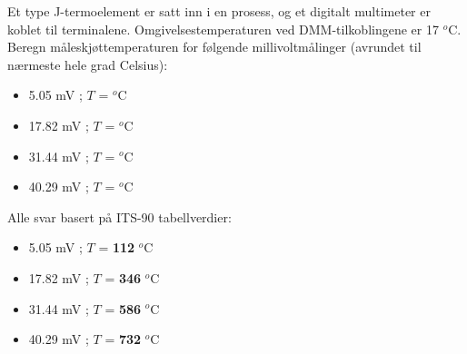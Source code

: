 
Et type J-termoelement er satt inn i en prosess, og et digitalt multimeter er koblet til terminalene. Omgivelsestemperaturen ved DMM-tilkoblingene er 17 $^{o}$C. Beregn måleskjøttemperaturen for følgende millivoltmålinger (avrundet til nærmeste hele grad Celsius):

\begin{itemize}
\item{} 5.05 mV ; $T$ = \underbar{\hskip 50pt} $^{o}$C
\vskip 10pt
\item{} 17.82 mV ; $T$ = \underbar{\hskip 50pt} $^{o}$C
\vskip 10pt
\item{} 31.44 mV ; $T$ = \underbar{\hskip 50pt} $^{o}$C
\vskip 10pt
\item{} 40.29 mV ; $T$ = \underbar{\hskip 50pt} $^{o}$C
\end{itemize}







Alle svar basert på ITS-90 tabellverdier:

\begin{itemize}
\item{} 5.05 mV ; $T$ = {\bf 112} $^{o}$C
\vskip 10pt
\item{} 17.82 mV ; $T$ = {\bf 346} $^{o}$C
\vskip 10pt
\item{} 31.44 mV ; $T$ = {\bf 586} $^{o}$C
\vskip 10pt
\item{} 40.29 mV ; $T$ = {\bf 732} $^{o}$C
\end{itemize}









